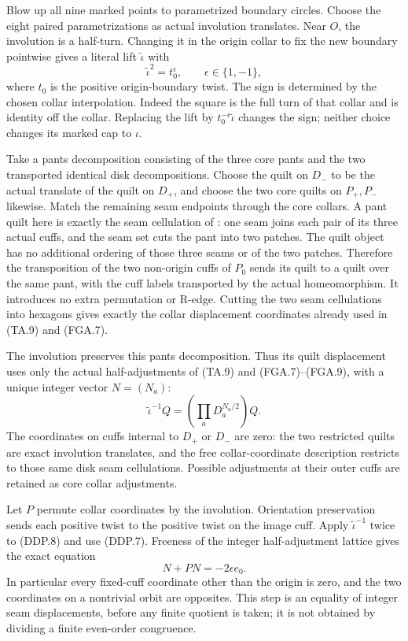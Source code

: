 Blow up all nine marked points to parametrized boundary circles.
Choose the eight paired parametrizations as actual involution
translates.  Near $O$, the involution is a half-turn.  Changing it
in the origin collar to fix the new boundary pointwise gives a
literal lift $\widetilde\iota$ with
\[
                  \widetilde\iota^2=t_0^{\epsilon},
                       \qquad\epsilon\in\{1,-1\},              \tag{DDP.7}
\]
where $t_0$ is the positive origin-boundary twist.  The sign is
determined by the chosen collar interpolation.  Indeed the square
is the full turn of that collar and is identity off the collar.
Replacing the lift by $t_0^{-\epsilon}\widetilde\iota$ changes the
sign; neither choice changes its marked cap to $\iota$.

Take a pants decomposition consisting of the three core pants and
the two transported identical disk decompositions.  Choose the
quilt on $D_-$ to be the actual translate of the quilt on $D_+$,
and choose the two core quilts on $P_+,P_-$ likewise.  Match the
remaining seam endpoints through the core collars.  A pant quilt
here is exactly the seam cellulation of \cite[\S7]{ET_NS2000}: one
seam joins each pair of its three actual cuffs, and the seam set
cuts the pant into two patches.  The quilt object has no additional
ordering of those three seams or of the two patches.  Therefore the
transposition of the two non-origin cuffs of $P_0$ sends its quilt
to a quilt over the same pant, with the cuff labels transported by
the actual homeomorphism.  It introduces no extra permutation or
R-edge.  Cutting the two seam cellulations into hexagons gives
exactly the collar displacement coordinates already used in
(TA.9) and (FGA.7).

The involution preserves this pants decomposition.  Thus its quilt displacement
uses only the actual half-adjustments of (TA.9) and (FGA.7)--(FGA.9),
with a unique integer vector $N=(N_a)$:
\[
        \widetilde\iota^{-1}Q
               =\left(\prod_a D_a^{N_a/2}\right)Q.              \tag{DDP.8}
\]
The coordinates on cuffs internal to $D_+$ or $D_-$ are zero:
the two restricted quilts are exact involution translates, and the
free collar-coordinate description restricts to those same disk
seam cellulations.  Possible adjustments at their outer cuffs are
retained as core collar adjustments.

Let $P$ permute collar coordinates by the involution.  Orientation
preservation sends each positive twist to the positive twist on
the image cuff.  Apply $\widetilde\iota^{-1}$ twice to (DDP.8)
and use (DDP.7).  Freeness of the integer half-adjustment lattice
gives the exact equation
\[
                       N+PN=-2\epsilon e_0.                    \tag{DDP.9}
\]
In particular every fixed-cuff coordinate other than the origin
is zero, and the two coordinates on a nontrivial orbit are
opposites.  This step is an equality of integer seam displacements,
before any finite quotient is taken; it is not obtained by dividing
a finite even-order congruence.

